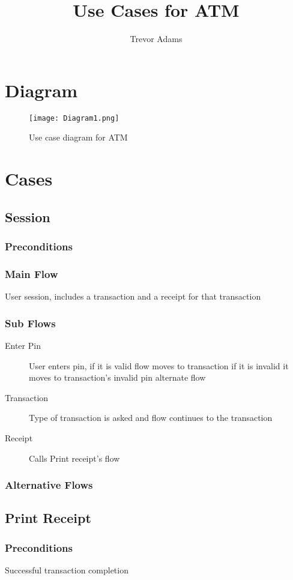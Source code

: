 \documentclass[10pt,letterpaper,notitlepage]{article}
\author{Trevor Adams}
\title{Use Cases for ATM}
\begin{document}
\section{ Diagram }
\begin{figure}[H]
   \centering
   \texttt{[image: Diagram1.png]}
   \caption{Use case diagram for ATM}
  \end{figure}
\section{ Cases }





\subsection{Session}
\subsubsection{Preconditions}
\subsubsection{Main Flow}
User session, includes a transaction and a receipt for that transaction 
\subsubsection{Sub Flows}
\begin{description}
\item[Enter Pin] User enters pin, if it is valid flow moves to transaction if it is invalid it moves to transaction's invalid pin alternate flow
\item[Transaction] Type of transaction is asked and flow continues to the transaction
\item[Receipt] Calls Print receipt's flow 
\end{description}
\subsubsection{Alternative Flows}




\subsection{Print Receipt}
\subsubsection{Preconditions}
Successful transaction completion
\end{document}
